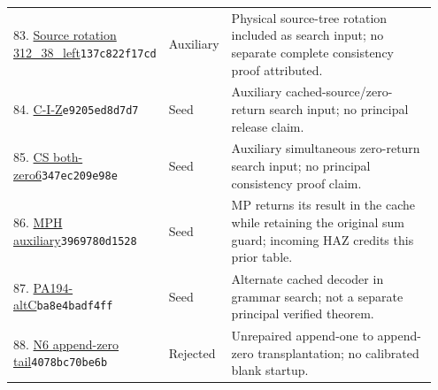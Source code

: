 \begin{longtable}{@{}p{0.27\linewidth}p{0.13\linewidth}p{0.55\linewidth}@{}}
83. \href{https://github.com/VladimirReshetnikov/ProveIt/blob/32d0d8b7d93a63ad4106c18cdb29b37927acdad2/Computability/BusyBeaver/Research/PA/docs/pa_consistency_research_2026-11-14_2/research/physical/inputs/rotations/312_38_left.tm}{Source rotation 312\_\allowbreak{}38\_\allowbreak{}left}\newline\texttt{137c822f17cd} & Auxiliary & Physical source-tree rotation included as search input; no separate complete consistency proof attributed.\\[5pt]
84. \href{https://github.com/VladimirReshetnikov/ProveIt/blob/32d0d8b7d93a63ad4106c18cdb29b37927acdad2/Computability/BusyBeaver/Research/PA/docs/pa194_radix_family_2026-11-13/search/machine_searches/inputs/C_I_Z.native.tm}{C-I-Z}\newline\texttt{e9205ed8d7d7} & Seed & Auxiliary cached-source/zero-return search input; no principal release claim.\\[5pt]
85. \href{https://github.com/VladimirReshetnikov/ProveIt/blob/32d0d8b7d93a63ad4106c18cdb29b37927acdad2/Computability/BusyBeaver/Research/PA/docs/PA194R_research_2026-11-14/research/state_search/inputs/CS_both_zero6.native.tm}{CS both-zero6}\newline\texttt{347ec209e98e} & Seed & Auxiliary simultaneous zero-return search input; no principal consistency proof claim.\\[5pt]
86. \href{https://github.com/VladimirReshetnikov/ProveIt/blob/32d0d8b7d93a63ad4106c18cdb29b37927acdad2/Computability/BusyBeaver/Research/PA/docs/pa194N_conpa_2026-11-13/research/physical/inputs/MPH.native.tm}{MPH auxiliary}\newline\texttt{3969780d1528} & Seed & MP returns its result in the cache while retaining the original sum guard; incoming HAZ credits this prior table.\\[5pt]
87. \href{https://github.com/VladimirReshetnikov/ProveIt/blob/32d0d8b7d93a63ad4106c18cdb29b37927acdad2/Computability/BusyBeaver/Research/PA/docs/pa194c_conpa/search/grammar/fresh_frontier/pa194altC.native.tm}{PA194-altC}\newline\texttt{ba8e4badf4ff} & Seed & Alternate cached decoder in grammar search; not a separate principal verified theorem.\\[5pt]
88. \href{https://github.com/VladimirReshetnikov/ProveIt/blob/32d0d8b7d93a63ad4106c18cdb29b37927acdad2/Computability/BusyBeaver/Research/PA/docs/pa_consistency_reduction_study_2026-11-13/research/control_sharing/inputs/n6_append0.native.tm}{N6 append-zero tail}\newline\texttt{4078bc70be6b} & Rejected & Unrepaired append-one to append-zero transplantation; no calibrated blank startup.\\[5pt]

\end{longtable}
